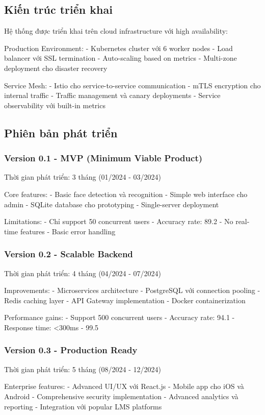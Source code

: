 \documentclass[12pt,a4paper]{report}
\begin{document}
\subsection{Kiến trúc triển khai}
Hệ thống được triển khai trên cloud infrastructure với high availability:

Production Environment:
- Kubernetes cluster với 6 worker nodes
- Load balancer với SSL termination
- Auto-scaling based on metrics
- Multi-zone deployment cho disaster recovery

Service Mesh:
- Istio cho service-to-service communication
- mTLS encryption cho internal traffic
- Traffic management và canary deployments
- Service observability với built-in metrics

\subsection{Phiên bản phát triển}
\subsubsection{Version 0.1 - MVP (Minimum Viable Product)}
Thời gian phát triển: 3 tháng (01/2024 - 03/2024)

Core features:
- Basic face detection và recognition
- Simple web interface cho admin
- SQLite database cho prototyping
- Single-server deployment

Limitations:
- Chỉ support 50 concurrent users
- Accuracy rate: 89.2%
- No real-time features
- Basic error handling

\subsubsection{Version 0.2 - Scalable Backend}
Thời gian phát triển: 4 tháng (04/2024 - 07/2024)

Improvements:
- Microservices architecture
- PostgreSQL với connection pooling
- Redis caching layer
- API Gateway implementation
- Docker containerization

Performance gains:
- Support 500 concurrent users
- Accuracy rate: 94.1%
- Response time: <300ms
- 99.5%

\subsubsection{Version 0.3 - Production Ready}
Thời gian phát triển: 5 tháng (08/2024 - 12/2024)

Enterprise features:
- Advanced UI/UX với React.js
- Mobile app cho iOS và Android
- Comprehensive security implementation
- Advanced analytics và reporting
- Integration với popular LMS platforms
\end{document}

